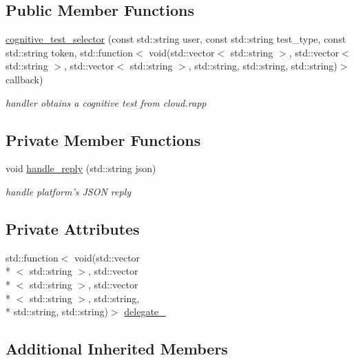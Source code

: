 \subsection*{Public Member Functions}
\begin{DoxyCompactItemize}
\item 
\hyperlink{classrapp_1_1cloud_1_1cognitive__test__selector_ad1eac997139d1e300c4652f9add4adc6}{cognitive\-\_\-test\-\_\-selector} (const std\-::string user, const std\-::string test\-\_\-type, const std\-::string token, std\-::function$<$ void(std\-::vector$<$ std\-::string $>$, std\-::vector$<$ std\-::string $>$, std\-::vector$<$ std\-::string $>$, std\-::string, std\-::string, std\-::string)$>$ callback)
\begin{DoxyCompactList}\small\item\em handler obtains a cognitive test from cloud.\-rapp \end{DoxyCompactList}\end{DoxyCompactItemize}
\subsection*{Private Member Functions}
\begin{DoxyCompactItemize}
\item 
void \hyperlink{classrapp_1_1cloud_1_1cognitive__test__selector_a0db4da25242262f6d520f9219624b005}{handle\-\_\-reply} (std\-::string json)
\begin{DoxyCompactList}\small\item\em handle platform's J\-S\-O\-N reply \end{DoxyCompactList}\end{DoxyCompactItemize}
\subsection*{Private Attributes}
\begin{DoxyCompactItemize}
\item 
std\-::function$<$ void(std\-::vector\\*
$<$ std\-::string $>$, std\-::vector\\*
$<$ std\-::string $>$, std\-::vector\\*
$<$ std\-::string $>$, std\-::string, \\*
std\-::string, std\-::string)$>$ \hyperlink{classrapp_1_1cloud_1_1cognitive__test__selector_ac6700af12c9cb0ebcd7b88005d7b0257}{delegate\-\_\-}
\end{DoxyCompactItemize}
\subsection*{Additional Inherited Members}


